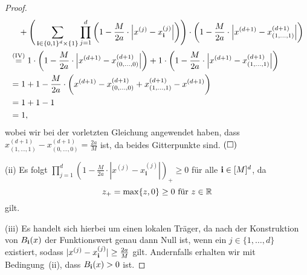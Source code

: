 \begin{proof}
\begin{equation*}
\begin{split}
& \quad + \Bigg(\sum_{\mathbf{i} \in \{0, 1\}^d \times \{1\}} \prod_{j = 1}^{d} \bigg(1 - \frac{M}{2a} \cdot \Big|x^{(j)} - x_{\mathbf{i}}^{(j)}\Big|\bigg)\Bigg) \cdot \bigg(1 - \frac{M}{2a} \cdot \Big|x^{(d + 1)} - x_{(1,\dots,1)}^{(d + 1)}\Big|\bigg) \\
& \stackrel{(\text{IV})}{=} 1 \cdot \bigg(1 - \frac{M}{2a} \cdot \Big|x^{(d + 1)} - x_{(0,\dots,0)}^{(d + 1)}\Big|\bigg) + 1 \cdot \bigg(1 - \frac{M}{2a} \cdot \Big|x^{(d + 1)} - x_{(1,\dots,1)}^{(d + 1)}\Big|\bigg) \\
& = 1 + 1 - \frac{M}{2a} \cdot \bigg(x^{(d + 1)} - x_{(0,\dots,0)}^{(d + 1)} + x_{(1,\dots,1)}^{(d + 1)} - x^{(d + 1)}\bigg) \\
& = 1 + 1 - 1 \\
& = 1,
\end{split}
\end{equation*}
wobei wir bei der vorletzten Gleichung angewendet haben, dass $x_{(1,\dots,1)}^{(d + 1)} - x_{(0,\dots,0)}^{(d + 1)} = \frac{2a}{M}$ ist, da beides Gitterpunkte sind.  $\hfill(\square)$ 		

(ii) Es folgt $\prod_{j = 1}^d (1 - \frac{M}{2a} \cdot |x^{(j)} - x_{\mathbf{i}}^{(j)}|)_+ \geq 0$ für alle $\mathbf{i} \in [M]^d$, da $$z_+= \max\{z, 0\} \geq 0 \text{ für $z \in \mathbb{R}$}$$ gilt.

(iii) Es handelt sich hierbei um einen lokalen Träger, da nach der Konstruktion von $B_{\mathbf{i}}(x)$ der Funktionswert genau dann Null ist, wenn ein $j \in \{1,\dots, d\}$ existiert, sodass $|x^{(j)} - x_{\mathbf{i}}^{(j)}| \geq \frac{2a}{M}$ gilt. Andernfalls erhalten wir mit Bedingung~(ii), dass $B_{\mathbf{i}}(x) > 0$ ist. 
\end{proof}

